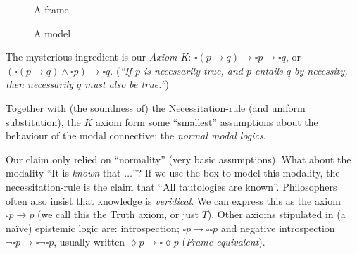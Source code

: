 \begin{figure}[ht]
\begin{minipage}[b]{0.4\linewidth}
\begin{center}
\end{center}
\caption{A frame}
\end{minipage}
\begin{minipage}[b]{0.4\linewidth}
\begin{center}
\end{center}
\caption{A model}
\end{minipage}


\end{figure}

The mysterious ingredient is our \textit{Axiom K}: $\square(p \to q) \to \square p \to \square q$, or $(\square(p \to q) \wedge \square p) \to \square q$. (\textit{``If $p$ is necessarily true, and $p$ entails $q$ by necessity, then necessarily $q$ must also be true.''})

Together with (the soundness of) the Necessitation-rule (and uniform substitution), the $K$ axiom form some ``smallest'' assumptions about the behaviour of the modal connective; the \textit{normal modal logics}.

Our claim only relied on ``normality'' (very basic assumptions). What about the modality ``It is \textit{known} that $\ldots$''? If we use the box to model this modality, the necessitation-rule is the claim that ``All tautologies are known''. Philosophers often also insist that knowledge is \textit{veridical}. We can express this as the axiom $\square p \to p$ (we call this the Truth axiom, or just $T$). Other axioms stipulated in (a na\"ive) epistemic logic are: introspection; $\square p \to \square\square p$ and negative introspection $\neg \square p\to \square \neg \square p$, usually written $\lozenge p \to \square \lozenge p$ (\textit{Frame-equivalent}).

